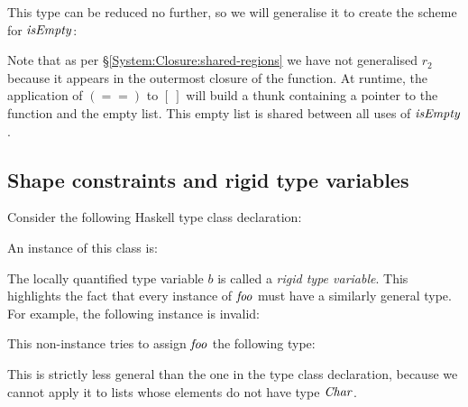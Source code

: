 This type can be reduced no further, so we will generalise it to create the scheme for $\operatorname{\mathit{isEmpty}}$:


Note that as per \S\ref{System:Closure:shared-regions} we have not generalised $r_2$ because it appears in the outermost closure of the function. At runtime, the application of $(==)$ to $[\ ]$ will build a thunk containing a pointer to the function and the empty list. This empty list is shared between all uses of $\operatorname{\mathit{isEmpty}}$.


\subsection{Shape constraints and rigid type variables}
Consider the following Haskell type class declaration:


An instance of this class is:


The locally quantified type variable $b$ is called a \emph{rigid type variable}. This highlights the fact that every instance of $\operatorname{\mathit{foo}}$ must have a similarly general type. For example, the following instance is invalid:


This non-instance tries to assign $\operatorname{\mathit{foo}}$ the following type:


This is strictly less general than the one in the type class declaration, because we cannot apply it to lists whose elements do not have type $\operatorname{\mathit{Char}}$. 

